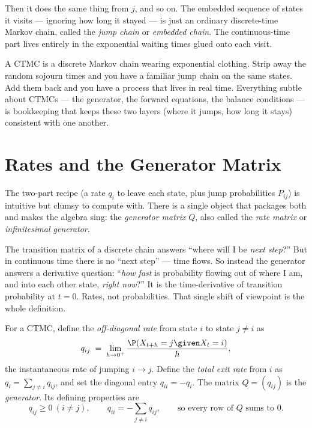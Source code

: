 Then it does the same thing from $j$, and so on. The embedded sequence of states it visits ---
ignoring how long it stayed --- is just an ordinary discrete-time Markov chain, called the
\emph{jump chain} or \emph{embedded chain}. The continuous-time part lives entirely in the
exponential waiting times glued onto each visit.

\begin{happeningbox}
A CTMC is a discrete Markov chain wearing exponential clothing. Strip away the random sojourn times
and you have a familiar jump chain on the same states. Add them back and you have a process that
lives in real time. Everything subtle about CTMCs --- the generator, the forward equations, the
balance conditions --- is bookkeeping that keeps these two layers (where it jumps, how long it
stays) consistent with one another.
\end{happeningbox}

\section{Rates and the Generator Matrix}
\label{ch27:generator}

The two-part recipe (a rate $q_i$ to leave each state, plus jump probabilities $P_{ij}$) is intuitive
but clumsy to compute with. There is a single object that packages both and makes the algebra sing:
the \emph{generator matrix} $Q$, also called the \emph{rate matrix} or \emph{infinitesimal
generator}.

\begin{intuitionbox}
The transition matrix of a discrete chain answers ``where will I be \emph{next step}?'' But in
continuous time there is no ``next step'' --- time flows. So instead the generator answers a
derivative question: ``\emph{how fast} is probability flowing out of where I am, and into each other
state, \emph{right now}?'' It is the time-derivative of transition probability at $t = 0$. Rates,
not probabilities. That single shift of viewpoint is the whole definition.
\end{intuitionbox}

\begin{definition}
\label{ch27:def-generator}
For a CTMC, define the \emph{off-diagonal rate} from state $i$ to state $j \ne i$ as
\[
  q_{ij} \;=\; \lim_{h \to 0^+} \frac{\P(X_{t+h} = j \given X_t = i)}{h},
\]
the instantaneous rate of jumping $i \to j$. Define the \emph{total exit rate} from $i$ as
$q_i = \sum_{j \ne i} q_{ij}$, and set the diagonal entry $q_{ii} = -q_i$. The matrix
$Q = (q_{ij})$ is the \emph{generator}. Its defining properties are
\[
  q_{ij} \ge 0 \ (i \ne j), \qquad q_{ii} = -\sum_{j \ne i} q_{ij},
  \qquad\text{so every row of } Q \text{ sums to } 0.
\]
\end{definition}

